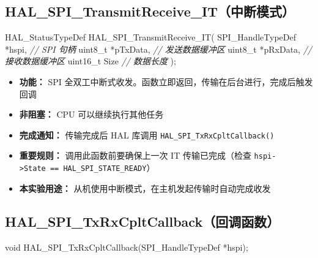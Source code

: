 \documentclass[
  chinese,
  UTF8,
  oneside,
  openany]{ctexbook}
\newenvironment{Shaded}{}{}
\newcommand{\CommentTok}[1]{\textcolor[rgb]{0.38,0.63,0.69}{\textit{#1}}}
\newcommand{\DataTypeTok}[1]{\textcolor[rgb]{0.56,0.13,0.00}{#1}}
\newcommand{\NormalTok}[1]{#1}
\newcommand{\OperatorTok}[1]{\textcolor[rgb]{0.40,0.40,0.40}{#1}}
\providecommand{\tightlist}{%
  \setlength{\itemsep}{0pt}\setlength{\parskip}{0pt}}
\begin{document}
\subsection{HAL\_SPI\_TransmitReceive\_IT（中断模式）}\label{hal_spi_transmitreceive_itux4e2dux65adux6a21ux5f0f}

\begin{Shaded}
\begin{Highlighting}[]
\NormalTok{HAL\_StatusTypeDef HAL\_SPI\_TransmitReceive\_IT}\OperatorTok{(}
\NormalTok{    SPI\_HandleTypeDef }\OperatorTok{*}\NormalTok{hspi}\OperatorTok{,}   \CommentTok{// SPI 句柄}
    \DataTypeTok{uint8\_t}           \OperatorTok{*}\NormalTok{pTxData}\OperatorTok{,} \CommentTok{// 发送数据缓冲区}
    \DataTypeTok{uint8\_t}           \OperatorTok{*}\NormalTok{pRxData}\OperatorTok{,} \CommentTok{// 接收数据缓冲区}
    \DataTypeTok{uint16\_t}\NormalTok{           Size     }\CommentTok{// 数据长度}
\OperatorTok{);}
\end{Highlighting}
\end{Shaded}

\begin{itemize}
\tightlist
\item
  \textbf{功能：} SPI
  全双工中断式收发。函数立即返回，传输在后台进行，完成后触发回调
\item
  \textbf{非阻塞：} CPU 可以继续执行其他任务
\item
  \textbf{完成通知：} 传输完成后 HAL 库调用
  \texttt{HAL\_SPI\_TxRxCpltCallback()}
\item
  \textbf{重要规则：} 调用此函数前要确保上一次 IT 传输已完成（检查
  \texttt{hspi-\textgreater{}State\ ==\ HAL\_SPI\_STATE\_READY}）
\item
  \textbf{本实验用途：} 从机使用中断模式，在主机发起传输时自动完成收发
\end{itemize}

\subsection{HAL\_SPI\_TxRxCpltCallback（回调函数）}\label{hal_spi_txrxcpltcallbackux56deux8c03ux51fdux6570}

\begin{Shaded}
\begin{Highlighting}[]
\DataTypeTok{void}\NormalTok{ HAL\_SPI\_TxRxCpltCallback}\OperatorTok{(}\NormalTok{SPI\_HandleTypeDef }\OperatorTok{*}\NormalTok{hspi}\OperatorTok{);}
\end{Highlighting}
\end{Shaded}
\end{document}
